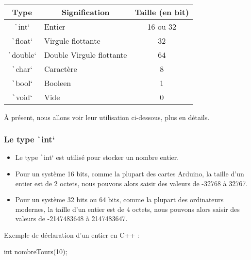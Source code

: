 \documentclass[10pt]{article}
\begin{document}
\begin{table}[H]
    \centering
    \begin{tabular}{|c|l|c|}
    \hline
    \textbf{Type} & \multicolumn{1}{c|}{\textbf{Signification}} & \textbf{Taille (en bit)} \\ \hline
    \texttt`int`           & Entier                                      & 16 ou 32                    \\ \hline
    \texttt`float`         & Virgule flottante                           & 32                          \\ \hline
    \texttt`double`        & Double Virgule flottante                    & 64                          \\ \hline
    \texttt`char`          & Caractère                                   & 8                          \\ \hline
    \texttt`bool`          & Booleen                                     & 1                          \\ \hline
    \texttt`void`          & Vide                                        & 0                          \\ \hline
    \end{tabular}
\end{table}

À présent, nous allons voir leur utilisation ci-dessous, plus en détails.

\subsubsection{Le type \texttt`int`}
\begin{itemize}
    \item Le type \texttt`int` est utilisé pour stocker un nombre entier.
    \item Pour un système 16 bits, comme la plupart des cartes Arduino, la taille d'un entier est de 2 octets, nous pouvons alors saisir des valeurs de -32768 à 32767.
    \item Pour un système 32 bits ou 64 bits, comme la plupart des ordinateurs modernes, la taille d'un entier est de 4 octets, nous pouvons alors saisir des valeurs de -2147483648 à 2147483647.
\end{itemize}

Exemple de déclaration d'un entier en C++ :

\begin{cppcode}
    int nombreTours(10);
\end{cppcode}
\end{document}
